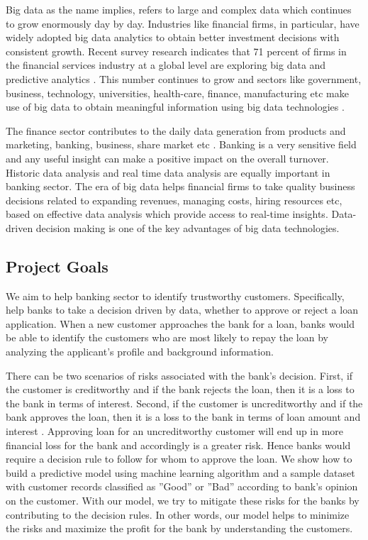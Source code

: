 \documentclass[sigconf]{acmart}
\begin{document}
Big data as the name implies, refers to large and complex data which continues to grow enormously day by day. Industries like financial firms, in particular, have widely adopted big data analytics to obtain better investment decisions with consistent growth. Recent survey research indicates that 71 percent of firms in the financial services industry at a global level are exploring big data and predictive analytics \cite{accenture-next-generation-financial}. This number continues to grow and sectors like government, business, technology, universities, health-care, finance, manufacturing etc make use of big data to obtain meaningful information using big data technologies \cite{wiki-bigdata}. 

The finance sector contributes to the daily data generation from products and marketing, banking, business, share market etc \cite{how-big-data-has-changed-finance}. Banking is a very sensitive field and any useful insight can make a positive impact on the overall turnover. Historic data analysis and real time data analysis are equally important in banking sector. The era of big data helps financial firms to take quality business decisions related to expanding revenues, managing costs, hiring resources etc, based on effective data analysis which provide access to real-time insights. Data-driven decision making is one of the key advantages of big data technologies.

\subsection{Project Goals}\label{Project goals}

We aim to help banking sector to identify trustworthy customers. Specifically, help banks to take a decision driven by data, whether to approve or reject a loan application. When a new customer approaches the bank for a loan, banks would be able to identify the customers who are most likely to repay the loan by analyzing the applicant's profile and background information. 

There can be two scenarios of risks associated with the bank's decision. First, if the customer is creditworthy and if the bank rejects the loan, then it is a loss to the bank in terms of interest. Second, if the customer is uncreditworthy and if the bank approves the loan, then it is a loss to the bank in terms of loan amount and interest \cite{psu-site}. Approving loan for an uncreditworthy customer will end up in more financial loss for the bank and accordingly is a greater risk. Hence banks would require a decision rule to follow for whom to approve the loan. We show how to build a predictive model using machine learning algorithm and a sample dataset with customer records classified as ''Good'' or ''Bad'' according to bank's opinion on the customer. With our model, we try to mitigate these risks for the banks by contributing to the decision rules. In other words, our model helps to minimize the risks and maximize the profit for the bank by understanding the customers.
\end{document}
